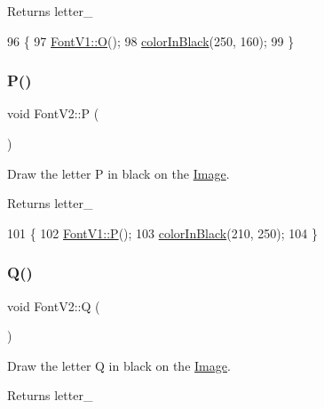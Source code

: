 \begin{DoxyReturn}{Returns}
letter\+\_\+ 
\end{DoxyReturn}

\begin{DoxyCode}
96                \{
97     \mbox{\hyperlink{class_font_v1_a9338f8d780e9913a848310355973ebf3}{FontV1::O}}();
98     \mbox{\hyperlink{class_font_v2_a04f2501961bc286ce70fbb6a840b0e8a}{colorInBlack}}(250, 160);
99 \}
\end{DoxyCode}
\mbox{\label{class_font_v2_ab47b245b84ea5c1dd89055c83b6ea052}} 
\subsubsection{\texorpdfstring{P()}{P()}}
{\footnotesize\ttfamily void Font\+V2\+::P (\begin{DoxyParamCaption}{ }\end{DoxyParamCaption})}



Draw the letter P in black on the \mbox{\hyperlink{class_image}{Image}}. 

\begin{DoxyReturn}{Returns}
letter\+\_\+ 
\end{DoxyReturn}

\begin{DoxyCode}
101                \{
102     \mbox{\hyperlink{class_font_v1_aeaf56ebe48a78aedf53626f50f10ee4d}{FontV1::P}}();
103     \mbox{\hyperlink{class_font_v2_a04f2501961bc286ce70fbb6a840b0e8a}{colorInBlack}}(210, 250);
104 \}
\end{DoxyCode}
\mbox{\label{class_font_v2_af8e979a962becf153ecc82051ad2c8fc}} 
\subsubsection{\texorpdfstring{Q()}{Q()}}
{\footnotesize\ttfamily void Font\+V2\+::Q (\begin{DoxyParamCaption}{ }\end{DoxyParamCaption})}



Draw the letter Q in black on the \mbox{\hyperlink{class_image}{Image}}. 

\begin{DoxyReturn}{Returns}
letter\+\_\+ 
\end{DoxyReturn}

